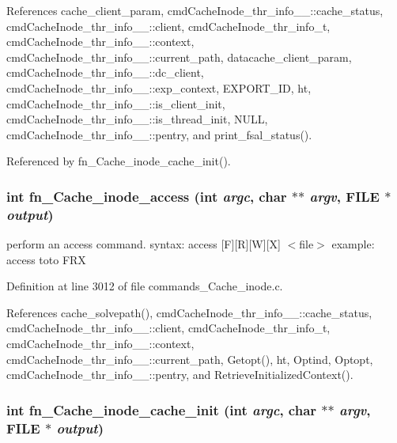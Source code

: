 References cache\_\-client\_\-param, cmd\-Cache\-Inode\_\-thr\_\-info\_\-\_\-::cache\_\-status, cmd\-Cache\-Inode\_\-thr\_\-info\_\-\_\-::client, cmd\-Cache\-Inode\_\-thr\_\-info\_\-t, cmd\-Cache\-Inode\_\-thr\_\-info\_\-\_\-::context, cmd\-Cache\-Inode\_\-thr\_\-info\_\-\_\-::current\_\-path, datacache\_\-client\_\-param, cmd\-Cache\-Inode\_\-thr\_\-info\_\-\_\-::dc\_\-client, cmd\-Cache\-Inode\_\-thr\_\-info\_\-\_\-::exp\_\-context, EXPORT\_\-ID, ht, cmd\-Cache\-Inode\_\-thr\_\-info\_\-\_\-::is\_\-client\_\-init, cmd\-Cache\-Inode\_\-thr\_\-info\_\-\_\-::is\_\-thread\_\-init, NULL, cmd\-Cache\-Inode\_\-thr\_\-info\_\-\_\-::pentry, and print\_\-fsal\_\-status().

Referenced by fn\_\-Cache\_\-inode\_\-cache\_\-init().
\subsubsection{\setlength{\rightskip}{0pt plus 5cm}int fn\_\-Cache\_\-inode\_\-access (int {\em argc}, char $\ast$$\ast$ {\em argv}, FILE $\ast$ {\em output})}\label{commands__Cache__inode_8c_a42}


perform an access command. syntax: access [F][R][W][X] $<$file$>$ example: access toto FRX 

Definition at line 3012 of file commands\_\-Cache\_\-inode.c.

References cache\_\-solvepath(), cmd\-Cache\-Inode\_\-thr\_\-info\_\-\_\-::cache\_\-status, cmd\-Cache\-Inode\_\-thr\_\-info\_\-\_\-::client, cmd\-Cache\-Inode\_\-thr\_\-info\_\-t, cmd\-Cache\-Inode\_\-thr\_\-info\_\-\_\-::context, cmd\-Cache\-Inode\_\-thr\_\-info\_\-\_\-::current\_\-path, Getopt(), ht, Optind, Optopt, cmd\-Cache\-Inode\_\-thr\_\-info\_\-\_\-::pentry, and Retrieve\-Initialized\-Context().
\subsubsection{\setlength{\rightskip}{0pt plus 5cm}int fn\_\-Cache\_\-inode\_\-cache\_\-init (int {\em argc}, char $\ast$$\ast$ {\em argv}, FILE $\ast$ {\em output})}\label{commands__Cache__inode_8c_a28}


